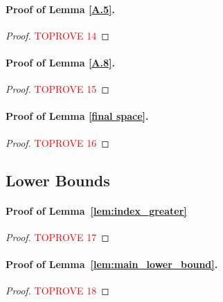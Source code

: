 \documentclass{article}
\theoremstyle{plain}
\begin{document}
\paragraph{Proof of Lemma \ref{A.5}.}
\begin{proof}\textcolor{red}{TOPROVE 14}\end{proof}


\paragraph{Proof of Lemma \ref{A.8}.}
\begin{proof}\textcolor{red}{TOPROVE 15}\end{proof}



\paragraph{Proof of Lemma \ref{final space}.}
\begin{proof}\textcolor{red}{TOPROVE 16}\end{proof}

\subsection{Lower Bounds}

\paragraph{Proof of Lemma~\ref{lem:index_greater}}
\begin{proof}\textcolor{red}{TOPROVE 17}\end{proof}

\paragraph{Proof of Lemma~\ref{lem:main_lower_bound}.}
\begin{proof}\textcolor{red}{TOPROVE 18}\end{proof}
 
\end{document}
